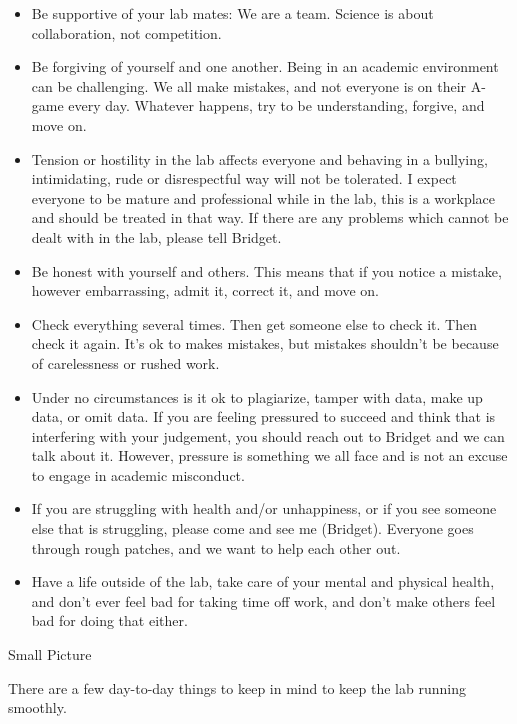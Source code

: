 \documentclass[]{book}
\begin{document}
\begin{itemize}
\item
  Be supportive of your lab mates: We are a team. Science is about collaboration, not competition.
\item
  Be forgiving of yourself and one another. Being in an academic environment can be challenging. We all make mistakes, and not everyone is on their A-game every day. Whatever happens, try to be understanding, forgive, and move on.
\item
  Tension or hostility in the lab affects everyone and behaving in a bullying, intimidating, rude or disrespectful way will not be tolerated. I expect everyone to be mature and professional while in the lab, this is a workplace and should be treated in that way. If there are any problems which cannot be dealt with in the lab, please tell Bridget.
\item
  Be honest with yourself and others. This means that if you notice a mistake, however embarrassing, admit it, correct it, and move on.
\item
  Check everything several times. Then get someone else to check it. Then check it again. It's ok to makes mistakes, but mistakes shouldn't be because of carelessness or rushed work.
\item
  Under no circumstances is it ok to plagiarize, tamper with data, make up data, or omit data. If you are feeling pressured to succeed and think that is interfering with your judgement, you should reach out to Bridget and we can talk about it. However, pressure is something we all face and is not an excuse to engage in academic misconduct.
\item
  If you are struggling with health and/or unhappiness, or if you see someone else that is struggling, please come and see me (Bridget). Everyone goes through rough patches, and we want to help each other out.
\item
  Have a life outside of the lab, take care of your mental and physical health, and don't ever feel bad for taking time off work, and don't make others feel bad for doing that either.
\end{itemize}

Small Picture

There are a few day-to-day things to keep in mind to keep the lab running smoothly.
\end{document}
